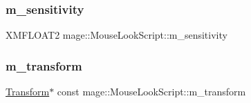 \subsubsection{\texorpdfstring{m\+\_\+sensitivity}{m\_sensitivity}}
{\footnotesize\ttfamily X\+M\+F\+L\+O\+A\+T2 mage\+::\+Mouse\+Look\+Script\+::m\+\_\+sensitivity\hspace{0.3cm}{\ttfamily [private]}}

\hypertarget{classmage_1_1_mouse_look_script_ade6a6a3d786d64b67594d8ed38757e24}{}\label{classmage_1_1_mouse_look_script_ade6a6a3d786d64b67594d8ed38757e24} 
\subsubsection{\texorpdfstring{m\+\_\+transform}{m\_transform}}
{\footnotesize\ttfamily \hyperlink{structmage_1_1_transform}{Transform}$\ast$ const mage\+::\+Mouse\+Look\+Script\+::m\+\_\+transform\hspace{0.3cm}{\ttfamily [private]}}

